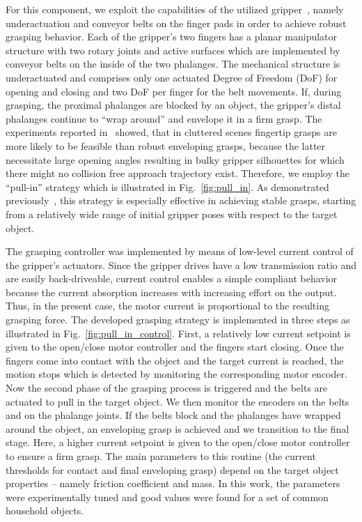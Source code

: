 %
 For this component, we exploit the capabilities of the utilized gripper~\cite{Tinc12}, namely
 underactuation and conveyor belts on the finger pads in order to achieve robust grasping
 behavior. Each of the gripper’s two fingers has a planar manipulator structure with two rotary
 joints and active surfaces which are implemented by conveyor belts on the inside of the two
 phalanges. The mechanical structure is underactuated and comprises only one actuated Degree of
 Freedom (DoF) for opening and closing and two DoF per finger for the belt movements. If, during
 grasping, the proximal phalanges are blocked by an object, the gripper’s distal phalanges continue
 to ``wrap around'' and envelope it in a firm grasp. The experiments reported in~\cite{Krug14a}
 showed, that in cluttered scenes fingertip grasps are more likely to be feasible than robust
 enveloping grasps, because the latter necessitate large opening angles resulting in bulky gripper
 silhouettes for which there might no collision free approach trajectory exist. Therefore, we employ
 the ``pull-in'' strategy which is illustrated in Fig.~\ref{fig:pull_in}. As demonstrated
 previously~\cite{Krug14c}, this strategy is especially effective in achieving stable grasps,
 starting from a relatively wide range of initial gripper poses with respect to the target object.
\par
The grasping controller was implemented by means of low-level current control of the gripper's
actuators. Since the gripper drives have a low transmission ratio and are easily back-driveable,
current control enables a simple compliant behavior because the current absorption increases with
increasing effort on the output. Thus, in the present case, the motor current is proportional to the
resulting grasping force. The developed grasping strategy is implemented in three steps as
illustrated in Fig.~\ref{fig:pull_in_control}. First, a relatively low current setpoint is given to
the open/close motor controller and the fingers start closing. Once the fingers come into contact
with the object and the target current is reached, the motion stops which is detected by monitoring
the corresponding motor encoder. Now the second phase of the grasping process is triggered and the
belts are actuated to pull in the target object.  We then monitor the encoders on the belts and on
the phalange joints. If the belts block and the phalanges have wrapped around the object, an
enveloping grasp is achieved and we transition to the final stage. Here, a higher current setpoint
is given to the open/close motor controller to ensure a firm grasp. The main parameters to this
routine (the current thresholds for contact and final enveloping grasp) depend on the target object
properties -- namely friction coefficient and mass. In this work, the parameters were
experimentally tuned and good values were found for a set of common household objects.
